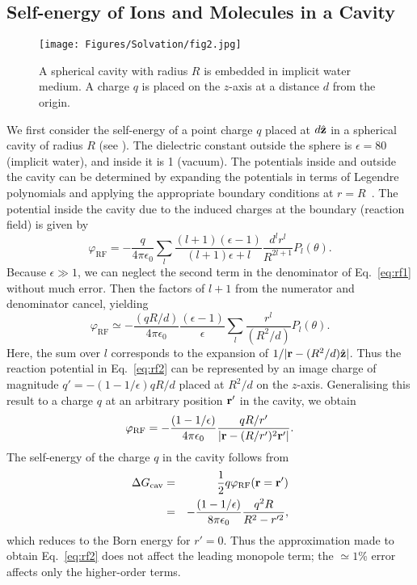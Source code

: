\subsection{Self-energy of Ions and Molecules in a Cavity}
\begin{figure}[b!]
\centering
\texttt{[image: Figures/Solvation/fig2.jpg]}
\caption{A spherical cavity with radius $R$ is embedded in implicit 
         water medium. A charge $q$ is placed on the $z$-axis at a 
         distance $d$ from the origin.}
\label{solv:fig2}
\end{figure}

We first consider the self-energy of a point charge $q$ placed at $d \hat{\bf z}$ in a spherical cavity 
of radius $R$ (see ). The dielectric constant outside the sphere is $\epsilon=80$ 
(implicit water), and inside it is 1 (vacuum). The potentials inside and outside the cavity can be 
determined by expanding the potentials in terms of Legendre polynomials and applying the appropriate 
boundary conditions at $r=R$~\cite{Jackson1999}. The potential inside the cavity due to the induced 
charges at the boundary (reaction field) is given by
\begin{equation}
\varphi_{\text{RF}} = 
-\frac{q}{4\pi\epsilon_0}\sum_{l}\frac{(l+1)(\epsilon-1)}
{(l+1)\epsilon+l } \frac{d^l r^l}{R^{2l+1}}P_{l}(\theta).
\label{eq:rf1}
\end{equation}
Because $\epsilon \gg 1$, we can neglect the second term in the denominator of Eq.~\eqref{eq:rf1} 
without much error. Then the factors of $l+1$ from the numerator and denominator cancel, yielding
\begin{equation}
\varphi_{\text{RF}} \simeq 
-\frac{(qR/d)}{4\pi\epsilon_0}\frac{(\epsilon-1)}{\epsilon}
\sum_{l}\frac{r^l}{(R^2/d)}P_{l}(\theta).
\label{eq:rf2}
\end{equation}
Here, the sum over $l$ corresponds to the expansion of $1/|{\bf r} -(R^2/d)\hat{\bf z}|$. Thus the 
reaction potential in Eq.~\eqref{eq:rf2} can be represented by an image charge of magnitude 
$q'=-(1-1/\epsilon)qR/d$ placed at $R^2/d$ on the $z$-axis. Generalising this result to a charge $q$ 
at an arbitrary position ${\bf r'}$ in the cavity, we obtain
\begin{equation}
\varphi_{\text{RF}} = -\frac{(1-1/\epsilon)}{4\pi\epsilon_0} \frac{qR/r'}
{|{\bf r}-(R/r')^2{\bf r'}|}.
\label{eq:rf3}
\end{equation}
The self-energy of the charge $q$ in the cavity follows from 
\begin{eqnarray}
\Delta G_{\text{cav}} &=& \frac{1}{2}q\varphi_{\text{RF}}({\bf r}={\bf r'})
\nonumber\\
&=& 
-\frac{(1-1/\epsilon)}{8\pi\epsilon_{0}} \frac{q^2R}{R^2 - r'^2},
\label{eq:ise}
\end{eqnarray}
which reduces to the Born energy for $r'=0$. Thus the approximation made to obtain Eq.~\eqref{eq:rf2} 
does not affect the leading monopole term; the  $\simeq 1$\% error affects only the higher-order terms.

